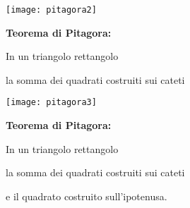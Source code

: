 \documentclass[italian,landscape]{report}
\begin{document}
\newframe

\begin{center}
\texttt{[image: pitagora2]}
\end{center}

\begin{firstheadlineitemize}

\item \textbf{Teorema di Pitagora:}

\begin{secondheadlineitemize}

\item  In un triangolo rettangolo 

\begin{thirdheadlineitemize}

\item la somma dei quadrati costruiti sui cateti

\end{thirdheadlineitemize}

\end{secondheadlineitemize}

\end{firstheadlineitemize}

\newframe

\begin{center}
\texttt{[image: pitagora3]}
\end{center}

\begin{firstheadlineitemize}

\item \textbf{Teorema di Pitagora:}

\begin{secondheadlineitemize}

\item  In un triangolo rettangolo 

\begin{thirdheadlineitemize}

\item la somma dei quadrati costruiti sui cateti

\item e il quadrato costruito sull'ipotenusa.

\end{thirdheadlineitemize}

\end{secondheadlineitemize}

\end{firstheadlineitemize}
\end{document}
